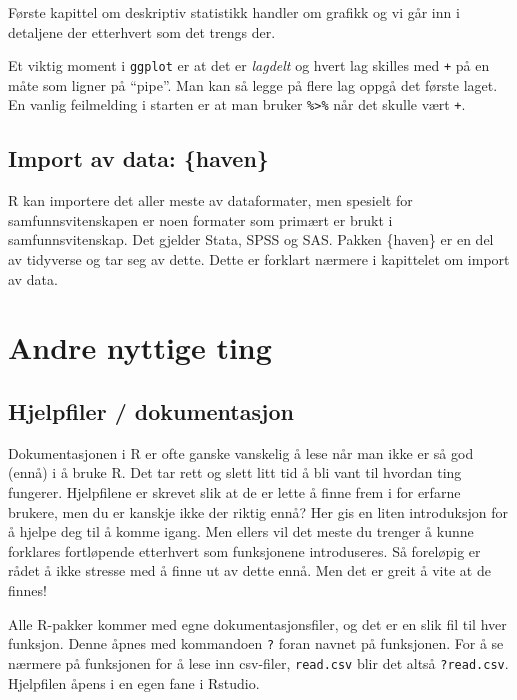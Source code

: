 \documentclass[
  letterpaper,
  DIV=11,
  numbers=noendperiod]{scrreprt}
\theoremstyle{definition}
\theoremstyle{remark}
\begin{document}
Første kapittel om deskriptiv statistikk handler om grafikk og vi går
inn i detaljene der etterhvert som det trengs der.

Et viktig moment i \texttt{ggplot} er at det er \emph{lagdelt} og hvert
lag skilles med \texttt{+} på en måte som ligner på ``pipe''. Man kan så
legge på flere lag oppgå det første laget. En vanlig feilmelding i
starten er at man bruker \texttt{\%\textgreater{}\%} når det skulle vært
\texttt{+}.

\hypertarget{import-av-data-haven}{%
\subsection{Import av data: \{haven\}}\label{import-av-data-haven}}

R kan importere det aller meste av dataformater, men spesielt for
samfunnsvitenskapen er noen formater som primært er brukt i
samfunnsvitenskap. Det gjelder Stata, SPSS og SAS. Pakken \{haven\} er
en del av tidyverse og tar seg av dette. Dette er forklart nærmere i
kapittelet om import av data.

\hypertarget{andre-nyttige-ting}{%
\section{Andre nyttige ting}\label{andre-nyttige-ting}}

\hypertarget{hjelpfiler-dokumentasjon}{%
\subsection{Hjelpfiler / dokumentasjon}\label{hjelpfiler-dokumentasjon}}

Dokumentasjonen i R er ofte ganske vanskelig å lese når man ikke er så
god (ennå) i å bruke R. Det tar rett og slett litt tid å bli vant til
hvordan ting fungerer. Hjelpfilene er skrevet slik at de er lette å
finne frem i for erfarne brukere, men du er kanskje ikke der riktig
ennå? Her gis en liten introduksjon for å hjelpe deg til å komme igang.
Men ellers vil det meste du trenger å kunne forklares fortløpende
etterhvert som funksjonene introduseres. Så foreløpig er rådet å ikke
stresse med å finne ut av dette ennå. Men det er greit å vite at de
finnes!

Alle R-pakker kommer med egne dokumentasjonsfiler, og det er en slik fil
til hver funksjon. Denne åpnes med kommandoen \texttt{?} foran navnet på
funksjonen. For å se nærmere på funksjonen for å lese inn csv-filer,
\texttt{read.csv} blir det altså \texttt{?read.csv}. Hjelpfilen åpens i
en egen fane i Rstudio.
\end{document}
